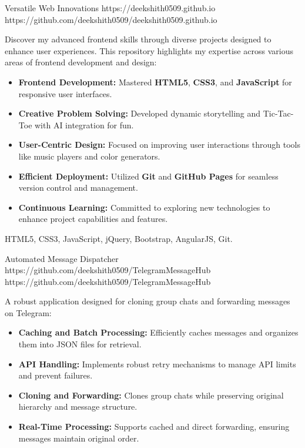 \documentclass[a4paper,10pt]{article}
\begin{document}
\vspace{10pt}
\projectentry
{Versatile Web Innovations}
{https://deekshith0509.github.io}
{https://github.com/deekshith0509/deekshith0509.github.io}
{Discover my advanced frontend skills through diverse projects designed to enhance user experiences. This repository highlights my expertise across various areas of frontend development and design:
\begin{itemize}
\item \textbf{Frontend Development:} Mastered \textbf{HTML5}, \textbf{CSS3}, and \textbf{JavaScript} for responsive user interfaces.
\item \textbf{Creative Problem Solving:} Developed dynamic storytelling and Tic-Tac-Toe with AI integration for fun.
\item \textbf{User-Centric Design:} Focused on improving user interactions through tools like music players and color generators.
\item \textbf{Efficient Deployment:} Utilized \textbf{Git} and \textbf{GitHub Pages} for seamless version control and management.
\item \textbf{Continuous Learning:} Committed to exploring new technologies to enhance project capabilities and features.
\end{itemize}
}{HTML5, CSS3, JavaScript, jQuery, Bootstrap, AngularJS, Git.}

\vspace{10pt}
\projectentry
{Automated Message Dispatcher}
{https://github.com/deekshith0509/TelegramMessageHub}
{https://github.com/deekshith0509/TelegramMessageHub}
{A robust application designed for cloning group chats and forwarding messages on Telegram:
\begin{itemize}
\item \textbf{Caching and Batch Processing:} Efficiently caches messages and organizes them into JSON files for retrieval.
\item \textbf{API Handling:} Implements robust retry mechanisms to manage API limits and prevent failures.
\item \textbf{Cloning and Forwarding:} Clones group chats while preserving original hierarchy and message structure.
\item \textbf{Real-Time Processing:} Supports cached and direct forwarding, ensuring messages maintain original order.
\end{itemize}
}{} 
\end{document}
